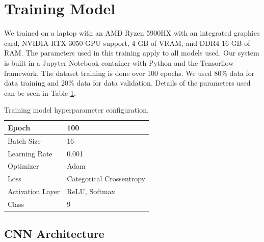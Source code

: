 \section{Training Model}
\label{sec3: training_model}
We trained on a laptop with an AMD Ryzen 5900HX with an integrated graphics card, NVIDIA RTX 3050 GPU support, 4 GB of VRAM, and DDR4 16 GB of RAM. The parameters used in this training apply to all models used. Our system is built in a Jupyter Notebook container with Python and the Tensorflow framework. The dataset training is done over 100 epochs. We used 80\% data for data training and 20\% data for data validation. Details of the parameters used can be seen in Table \ref{tab:hyperparameters}.

\begin{table}[h!]
	\centering
	\caption{Training model hyperparameter configuration.}
	\label{tab:hyperparameters}
	\begin{tabular}{|l|l|}
		\hline
		Epoch            & 100                      \\ \hline
		Batch Size       & 16                       \\ \hline
		Learning Rate    & 0.001                    \\ \hline
		Optimizer        & Adam                     \\ \hline
		Loss             & Categorical Crossentropy \\ \hline
		Activation Layer & ReLU, Softmax            \\ \hline
		Class            & 9                        \\ \hline
	\end{tabular}
\end{table}

\subsection{CNN Architecture}

